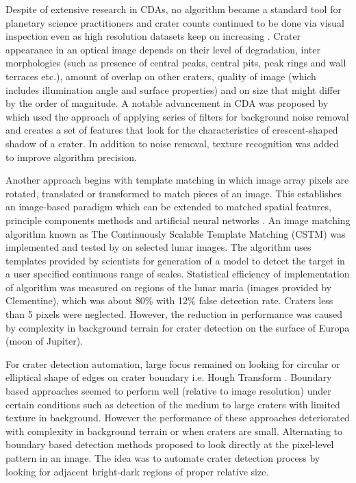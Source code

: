 \documentclass[11pt]{article}
\begin{document}
Despite of extensive research in CDAs, no algorithm became a standard tool for planetary science practitioners and crater counts continued to be done via visual inspection even as high resolution datasets keep on increasing \cite{bandeira2010automatic}. Crater appearance in an optical image depends on their level of degradation, inter morphologies (such as presence of central peaks, central pits, peak rings and wall terraces etc.), amount of overlap on other craters, quality of image (which includes illumination angle and surface properties) and on size that might differ by the order of magnitude. A notable advancement in CDA was proposed by \cite{bandeira2010automatic} which used the approach of applying series of filters for background noise removal and creates a set of features that look for the characteristics of crescent-shaped shadow of a crater. In addition to noise removal, texture recognition was added to improve algorithm precision.

Another approach begins with template matching in which image array pixels are rotated, translated or transformed to match pieces of an image. This establishes an image-based paradigm which can be extended to matched spatial features, principle components methods and artificial neural networks \cite{brunelli1993face}. An image matching algorithm known as The Continuously Scalable Template Matching (CSTM) was implemented and tested by \cite{burl2001automated} on selected lunar images. The algorithm uses templates provided by scientists for generation of a model to detect the target in a user specified continuous range of scales. Statistical efficiency of implementation of algorithm was measured on regions of the lunar maria (images provided by Clementine), which was about 80\% with 12\% false detection rate. Craters less than 5 pixels were neglected. However, the reduction in performance was caused by complexity in background terrain for crater detection on the surface of Europa (moon of Jupiter).

For crater detection automation, large focus remained on looking for circular or elliptical shape of edges on crater boundary i.e. Hough Transform \cite{honda2000crater}.  Boundary based approaches seemed to perform well (relative to image resolution) under certain conditions such as detection of the medium to large craters with limited texture in background. However the performance of these approaches deteriorated with complexity in background terrain or when craters are small. Alternating to boundary based detection methods \cite{wetzler2005learning} proposed to look directly at the pixel-level pattern in an image. The idea was to automate crater detection process by looking for adjacent bright-dark regions of proper relative size.
\end{document}
